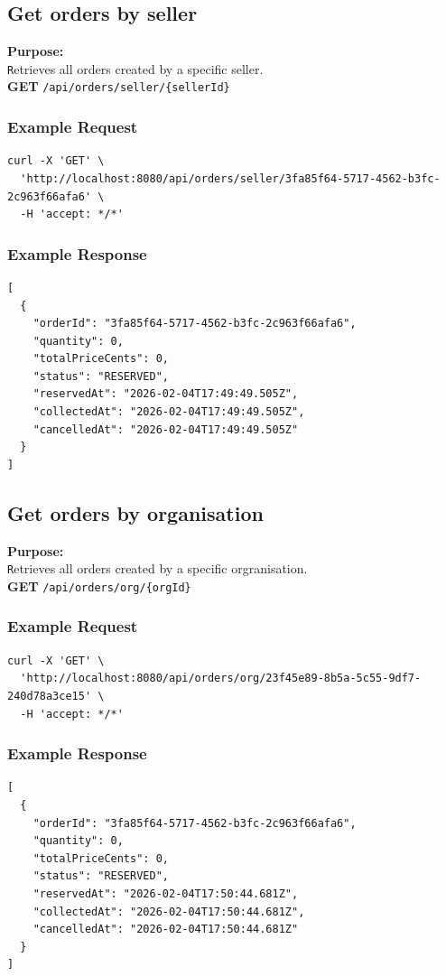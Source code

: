 \documentclass[a4paper,11pt]{article}
\begin{document}
\subsection{Get orders by seller}
\textbf{Purpose:} \\ \texttt Retrieves all orders created by a specific seller. \\

\textbf{GET} \texttt{/api/orders/seller/\{sellerId\}}

\subsubsection*{Example Request}
\begin{lstlisting}
curl -X 'GET' \
  'http://localhost:8080/api/orders/seller/3fa85f64-5717-4562-b3fc-2c963f66afa6' \
  -H 'accept: */*'
\end{lstlisting}

\subsubsection*{Example Response}
\begin{lstlisting}
[
  {
    "orderId": "3fa85f64-5717-4562-b3fc-2c963f66afa6",
    "quantity": 0,
    "totalPriceCents": 0,
    "status": "RESERVED",
    "reservedAt": "2026-02-04T17:49:49.505Z",
    "collectedAt": "2026-02-04T17:49:49.505Z",
    "cancelledAt": "2026-02-04T17:49:49.505Z"
  }
]
\end{lstlisting}

\subsection{Get orders by organisation}
\textbf{Purpose:} \\ \texttt Retrieves all orders created by a specific orgranisation. \\

\textbf{GET} \texttt{/api/orders/org/\{orgId\}}

\subsubsection*{Example Request}
\begin{lstlisting}
curl -X 'GET' \
  'http://localhost:8080/api/orders/org/23f45e89-8b5a-5c55-9df7-240d78a3ce15' \
  -H 'accept: */*'
\end{lstlisting}

\subsubsection*{Example Response}
\begin{lstlisting}
[
  {
    "orderId": "3fa85f64-5717-4562-b3fc-2c963f66afa6",
    "quantity": 0,
    "totalPriceCents": 0,
    "status": "RESERVED",
    "reservedAt": "2026-02-04T17:50:44.681Z",
    "collectedAt": "2026-02-04T17:50:44.681Z",
    "cancelledAt": "2026-02-04T17:50:44.681Z"
  }
]
\end{lstlisting}
\end{document}
